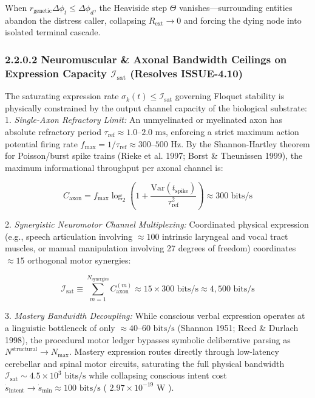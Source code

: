\documentclass[11pt,a4paper]{article}
\theoremstyle{definition}
\theoremstyle{remark}
\begin{document}
When $r_{\text{genetic}}\Delta\phi_t \le \Delta\phi_d$, the Heaviside step $\Theta$ vanishes—surrounding entities abandon the distress caller, collapsing $R_{\text{ext}} \to 0$ and forcing the dying node into isolated terminal cascade.

\subsubsection{2.2.0.2 Neuromuscular \& Axonal Bandwidth Ceilings on Expression Capacity $\mathcal{I}_{\text{sat}}$ (Resolves ISSUE-4.10)}

The saturating expression rate $\sigma_k(t) \le \mathcal{I}_{\text{sat}}$ governing Floquet stability is physically constrained by the output channel capacity of the biological substrate:
1. \textit{Single-Axon Refractory Limit:} An unmyelinated or myelinated axon has absolute refractory period $\tau_{\text{ref}} \approx 1.0\text{--}2.0\text{ ms}$, enforcing a strict maximum action potential firing rate $f_{\max} = 1/\tau_{\text{ref}} \approx 300\text{--}500\text{ Hz}$. By the Shannon-Hartley theorem for Poisson/burst spike trains (Rieke et al. 1997; Borst \& Theunissen 1999), the maximum informational throughput per axonal channel is:


\begin{equation}
C_{\text{axon}} = f_{\max} \log_2\left(1 + \frac{\text{Var}(t_{\text{spike}})}{\tau_{\text{ref}}^2}\right) \approx 300\text{ bits/s}
\end{equation}


2. \textit{Synergistic Neuromotor Channel Multiplexing:} Coordinated physical expression (e.g., speech articulation involving $\approx 100$ intrinsic laryngeal and vocal tract muscles, or manual manipulation involving 27 degrees of freedom) coordinates $\approx 15$ orthogonal motor synergies:


\begin{equation}
\boxed{\mathcal{I}_{\text{sat}} \equiv \sum_{m=1}^{N_{\text{synergies}}} C_{\text{axon}}^{(m)} \approx 15 \times 300\text{ bits/s} \approx 4{,}500\text{ bits/s}}
\end{equation}


3. \textit{Mastery Bandwidth Decoupling:} While conscious verbal expression operates at a linguistic bottleneck of only $\approx 40\text{--}60\text{ bits/s}$ (Shannon 1951; Reed \& Durlach 1998), the procedural motor ledger bypasses symbolic deliberative parsing as $N^{\text{structural}} \to N_{\max}$. Mastery expression routes directly through low-latency cerebellar and spinal motor circuits, saturating the full physical bandwidth $\mathcal{I}_{\text{sat}} \sim 4.5 \times 10^3\text{ bits/s}$ while collapsing conscious intent cost $\dot{s}_{\text{intent}} \to \dot{s}_{\min} \approx 100\text{ bits/s}$ ( $2.97 \times 10^{-19}\text{ W}$ ).
\end{document}
